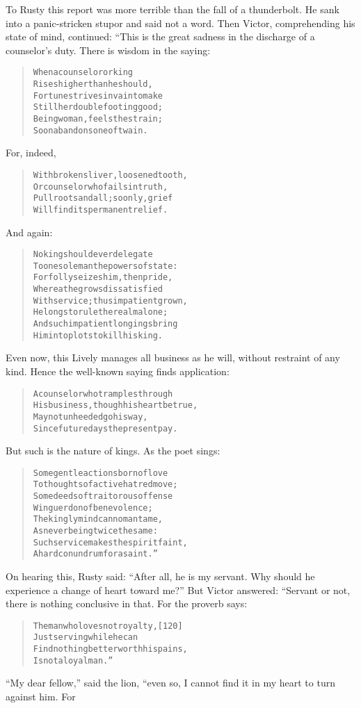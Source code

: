 \documentclass[article, twoside, 14pt]{memoir}
\renewenvironment{verbatim}{%
\begin{quote}%
\vskip -10pt%
\begin{alltt}\normalfont\large}{\end{alltt}%
\end{quote}%
\vskip -10pt
} %
\begin{document}
To Rusty this report was more terrible than the fall of a
thunderbolt. He sank into a panic-stricken stupor and said not a
word. Then Victor, comprehending his state of mind, continued:
“This is the great sadness in the discharge of a counselor's duty.
There is wisdom in the saying:

\begin{verbatim}
When a counselor or king
    Rises higher than he should,
Fortune strives in vain to make
    Still her double footing good;
Being woman, feels the strain;
Soon abandons one of twain.
\end{verbatim}
For, indeed,

\begin{verbatim}
With broken sliver, loosened tooth,
Or counselor who fails in truth,
Pull roots and all; so only, grief
Will find its permanent relief.
\end{verbatim}
And again:

\begin{verbatim}
No king should ever delegate
To one sole man the powers of state:
For folly seizes him, then pride,
Whereat he grows dissatisfied
With service; thus impatient grown,
He longs to rule the realm alone;
And such impatient longings bring
Him into plots to kill his king.
\end{verbatim}
Even now, this Lively manages all business as he will, without
restraint of any kind. Hence the well-known saying finds
application:

\begin{verbatim}
A counselor who tramples through
His business, though his heart be true,
May not unheeded go his way,
Since future days the present pay.
\end{verbatim}
But such is the nature of kings. As the poet sings:

\begin{verbatim}
Some gentle actions born of love
To thoughts of active hatred move;
Some deeds of traitorous offense
Win guerdon of benevolence;
The kingly mind can no man tame,
As never being twice the same:
Such service makes the spirit faint,
A hard conundrum for a saint.”
\end{verbatim}
On hearing this, Rusty said:
``After all, he is my servant. Why should he experience a change of heart toward me?''
But Victor answered: “Servant or not, there is nothing conclusive
in that. For the proverb says:

\begin{verbatim}
The man who loves not royalty,                          [120]
    Just serving while he can
Find nothing better worth his pains,
    Is not a loyal man.”
\end{verbatim}
``My dear fellow,'' said the lion, “even so, I cannot find it in my
heart to turn against him. For
\end{document}
